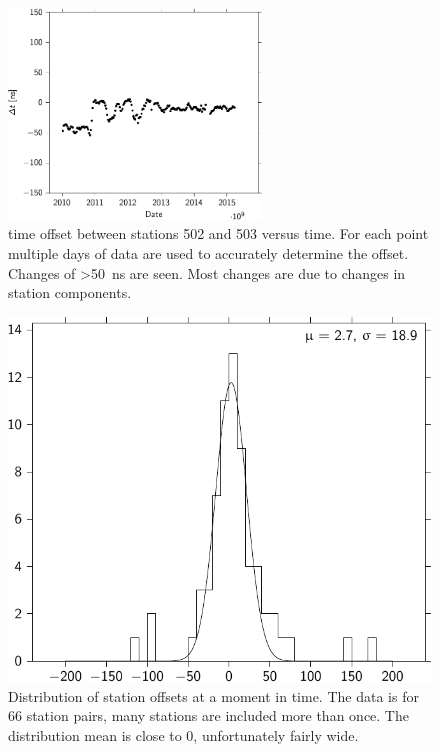 \begin{figure}
    \centering
    \includegraphics[width=0.6\textwidth]
                    {plots/cluster/offsets_ref502_503_pairs}
    \caption{\gps time offset between stations 502 and 503 versus time. For each point multiple days of data are used to accurately determine the offset. Changes of \SI{>50}{\ns} are seen. Most changes are due to changes in station components.}
    \label{fig:offsets_ref502_503_pairss}
\end{figure}

\begin{figure}
    \centering
    \includegraphics{plots/cluster/offset_distribution}
    \caption{Distribution of station offsets at a moment in time. The data is for 66 station pairs, many stations are included more than once. The distribution mean is close to 0, unfortunately fairly wide.}
    \label{fig:test_offset_distribution}
\end{figure}


